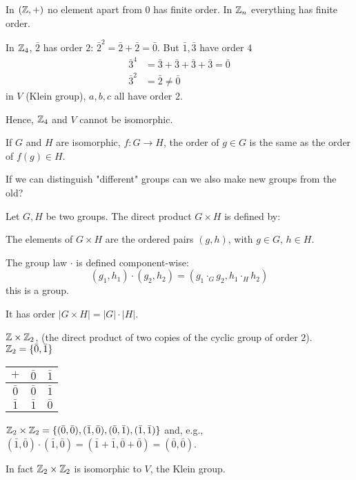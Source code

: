 \documentclass[10pt, a4paper]{article}
\begin{document}
In $(\mathbb{Z}, +)$ no element apart from $0$ has finite order.
In $\mathbb{Z}_n$ everything has finite order.

\begin{example}
    In $\mathbb{Z}_4$,
    $\bar{2}$ has order $2$:
    $\bar{2} ^ 2 = \bar{2} + \bar{2} = \bar{0}$.
    But $\bar{1}, \bar{3}$ have order $4$
    \begin{align*}
        \bar{3} ^ 4 &= \bar{3} + \bar{3} + \bar{3} + \bar{3} = \bar{0} \\
        \bar{3} ^ 2 &= \bar{2} \neq \bar{0}
    \end{align*}
    in $V$
    (Klein group),
    $a, b, c$ all have order $2$.

    Hence,
    $\mathbb{Z}_4$ and $V$ cannot be isomorphic.
\end{example}

\begin{proposition}
    If $G$ and $H$ are isomorphic,
    $f : G \to H$,
    the order of $g \in G$ is the same as the order of $f(g) \in H$.
\end{proposition}

If we can distinguish "different" groups can we also make new groups from the old?

\begin{definition}
    Let $G, H$ be two groups.
    The direct product $G \times H$ is defined by:
    
    The elements of $G \times H$ are the ordered pairs $(g, h)$,
    with $g \in G$,
    $h \in H$.

    The group law $\cdot$ is defined component-wise:
    \[
    (g_1, h_1) \cdot (g_2, h_2) = (g_1 \cdot_G g_2, h_1 \cdot_H h_2)
    \]
    this is a group.

    It has order $|G \times H| = |G|\cdot|H|$.
\end{definition}

\begin{example}
    $\mathbb{Z} \times \mathbb{Z}_2$,
    (the direct product of two copies of the cyclic group of order $2$).
    $\mathbb{Z}_2 = \{\bar{0}, \bar{1}\}$
    \begin{table}[H]
        \centering
        \begin{tabular}{c|cc}
             $+$ & $\bar{0}$ & $\bar{1}$ \\
             \hline
             $\bar{0}$ & $\bar{0}$ & $\bar{1}$ \\
             $\bar{1}$ & $\bar{1}$ & $\bar{0}$
        \end{tabular}
    \end{table}
    $\mathbb{Z}_2 \times \mathbb{Z}_2 = \{(\bar{0}, \bar{0}), (\bar{1}, \bar{0}), (\bar{0}, \bar{1}), (\bar{1}, \bar{1})\}$ and,
    e.g.,
    $(\bar{1}, \bar{0}) \cdot (\bar{1}, \bar{0}) = (\bar{1} + \bar{1}, \bar{0} + \bar{0}) = (\bar{0}, \bar{0})$.

    In fact $\mathbb{Z}_2 \times \mathbb{Z}_2$ is isomorphic to $V$,
    the Klein group.
\end{example}
\end{document}
